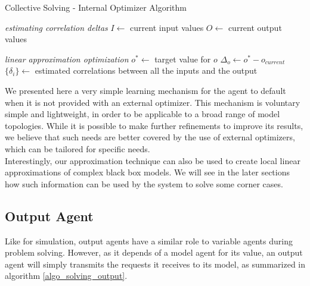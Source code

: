 \begin{algorithm}
\caption{Collective Solving - Internal Optimizer Algorithm}
\label{algo_solving_internaloptim}

\emph{estimating correlation deltas}\;
$I \leftarrow$ current input values\;
$O \leftarrow$ current output values\;

\BlankLine\BlankLine
\emph{linear approximation optimization}\;
$o^* \leftarrow $ target value for $o$\;
$\Delta_o \leftarrow o^* - o_{current}$\;
$\{\delta_i\} \leftarrow $ estimated correlations between all the inputs and the output\;
\end{algorithm}

We presented here a very simple learning mechanism for the agent to default when it is not provided with an external optimizer. This mechanism is voluntary simple and lightweight, in order to be applicable to a broad range of model topologies. While it is possible to make further refinements to improve its results, we believe that such needs are better covered by the use of external optimizers, which can be tailored for specific needs.\\
Interestingly, our approximation technique can also be used to create local linear approximations of complex black box models. We will see in the later sections how such information can be used by the system to solve some corner cases.

\subsection{Output Agent}

Like for simulation, output agents have a similar role to variable agents during problem solving. However, as it depends of a model agent for its value, an output agent will simply transmits the requests it receives to its model, as summarized in algorithm \ref{algo_solving_output}.

